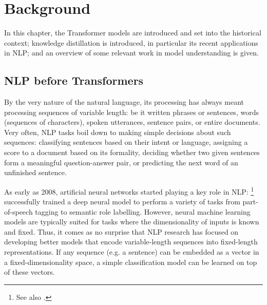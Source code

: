 \documentclass[bsc,frontabs,twoside,singlespacing,parskip,deptreport]{infthesis}
\begin{document}
\chapter{Background}{
  \label{ch:background}

  In this chapter, the Transformer models are introduced and set into the historical context; knowledge distillation is introduced, in particular its recent applications in NLP; and an overview of some relevant work in model understanding is given.

  \section{NLP before Transformers}{
    \label{sec:pre-transformer-nlp}
    By the very nature of the natural language, its processing has always meant processing sequences of variable length: be it written phrases or sentences, words (sequences of characters), spoken utterances, sentence pairs, or entire documents.
    Very often, NLP tasks boil down to making simple decisions about such sequences: classifying sentences based on their intent or language, assigning a score to a document based on its formality, deciding whether two given sentences form a meaningful question-answer pair, or predicting the next word of an unfinished sentence.

    As early as 2008, artificial neural networks started playing a key role in NLP: \citet{Collobert_Weston_2008}\footnote{See also \citet{Collobert_Weston_2011}.} successfully trained a deep neural model to perform a variety of tasks from part-of-speech tagging to semantic role labelling.
    However, neural machine learning models are typically suited for tasks where the dimensionality of inputs is known and fixed. Thus, it comes as no surprise that NLP research has focused on developing better models that encode variable-length sequences into fixed-length representations. 
    If any sequence (e.g. a sentence) can be embedded as a vector in a fixed-dimensionality space, a simple classification model can be learned on top of these vectors.
    
}}
\end{document}
